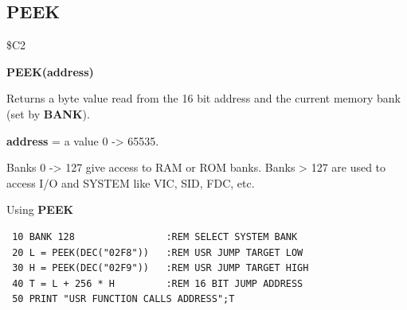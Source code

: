 
\newpage
\subsection{PEEK}
\begin{description}[leftmargin=2cm,style=nextline]
\item [Token:] \$C2
\item [Format:] {\bf PEEK(address)}
\item [Usage:]  Returns a byte value
                read from the 16 bit address and the current
                memory bank (set by {\bf BANK}).

                {\bf address} = a value 0 -> 65535.

\item [Remarks:] Banks 0 -> 127 give access to RAM or ROM banks.
                 Banks > 127 are used to access I/O and SYSTEM
                 like VIC, SID, FDC, etc.
\item [Example:] Using {\bf PEEK}

\begin{tcolorbox}[colback=black,coltext=white]
\verbatimfont{\codefont}
\begin{verbatim}
 10 BANK 128                :REM SELECT SYSTEM BANK
 20 L = PEEK(DEC("02F8"))   :REM USR JUMP TARGET LOW
 30 H = PEEK(DEC("02F9"))   :REM USR JUMP TARGET HIGH
 40 T = L + 256 * H         :REM 16 BIT JUMP ADDRESS
 50 PRINT "USR FUNCTION CALLS ADDRESS";T
\end{verbatim}
\end{tcolorbox}
\end{description}


\newpage
